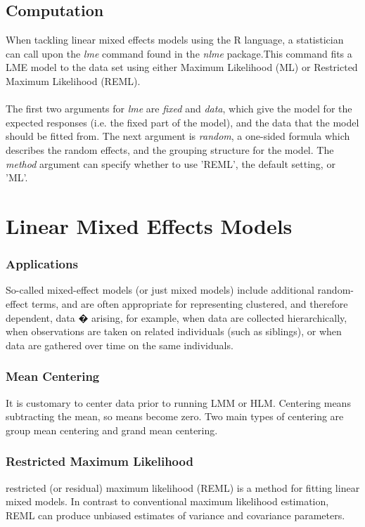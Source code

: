 \documentclass[12pt, a4paper]{report}
\begin{document}
\subsection{Computation} When tackling linear mixed effects models
using the R language, a statistician can call upon the \emph{lme}
command found in the \emph{nlme} package.This command fits a LME
model to the data set using either Maximum Likelihood (ML) or
Restricted Maximum Likelihood (REML).
\\
\\
The first two arguments for \emph{lme} are \emph{fixed} and
\emph{data}, which give the model for the expected responses (i.e.
the fixed part of the model), and the data that the model should
be fitted from. The next argument is  \emph{random}, a one-sided
formula which describes the random effects, and the grouping
structure for the model. The  \emph{method} argument can specify
whether to use 'REML', the default setting, or 'ML'.

\newpage


\section{Linear Mixed Effects Models}
\subsubsection{Applications}
So-called mixed-effect models (or just mixed models) include
additional random-effect terms, and are often appropriate for
representing clustered, and therefore dependent, data � arising,
for example, when data are collected hierarchically, when
observations are taken on related individuals (such as siblings),
or when data are gathered over time on the same individuals.
\subsubsection{Mean Centering}
It is customary to center data prior to running LMM or HLM.
Centering means subtracting the mean, so means become zero. Two
main types of centering are group mean centering and grand mean
centering.
\subsubsection{Restricted Maximum Likelihood}
restricted (or residual) maximum likelihood (REML) is a method for
fitting linear mixed models. In contrast to conventional maximum
likelihood estimation, REML can produce unbiased estimates of
variance and covariance parameters.
\end{document}

